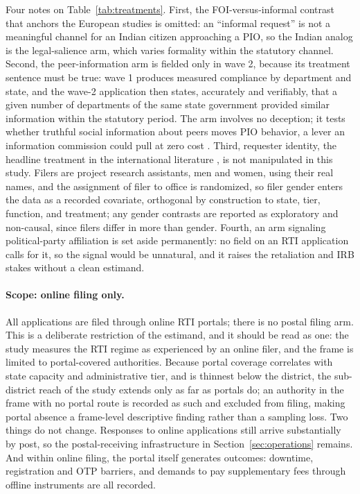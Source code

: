 \documentclass[11pt]{article}
\begin{document}
Four notes on Table~\ref{tab:treatments}. First, the FOI-versus-informal contrast that anchors the European studies \citep{worthy2017, grimmelikhuijsen2019} is omitted: an ``informal request'' is not a meaningful channel for an Indian citizen approaching a PIO, so the Indian analog is the legal-salience arm, which varies formality within the statutory channel. Second, the peer-information arm is fielded only in wave 2, because its treatment sentence must be true: wave 1 produces measured compliance by department and state, and the wave-2 application then states, accurately and verifiably, that a given number of departments of the same state government provided similar information within the statutory period. The arm involves no deception; it tests whether truthful social information about peers moves PIO behavior, a lever an information commission could pull at zero cost \citep{benaaron2017}. Third, requester identity, the headline treatment in the international literature \citep{osji2006, michener2020, pineiro2018}, is not manipulated in this study. Filers are project research assistants, men and women, using their real names, and the assignment of filer to office is randomized, so filer gender enters the data as a recorded covariate, orthogonal by construction to state, tier, function, and treatment; any gender contrasts are reported as exploratory and non-causal, since filers differ in more than gender. Fourth, an arm signaling political-party affiliation is set aside permanently: no field on an RTI application calls for it, so the signal would be unnatural, and it raises the retaliation and IRB stakes without a clean estimand.

\paragraph{Scope: online filing only.} All applications are filed through online RTI portals; there is no postal filing arm. This is a deliberate restriction of the estimand, and it should be read as one: the study measures the RTI regime as experienced by an online filer, and the frame is limited to portal-covered authorities. Because portal coverage correlates with state capacity and administrative tier, and is thinnest below the district, the sub-district reach of the study extends only as far as portals do; an authority in the frame with no portal route is recorded as such and excluded from filing, making portal absence a frame-level descriptive finding rather than a sampling loss. Two things do not change. Responses to online applications still arrive substantially by post, so the postal-receiving infrastructure in Section~\ref{sec:operations} remains. And within online filing, the portal itself generates outcomes: downtime, registration and OTP barriers, and demands to pay supplementary fees through offline instruments are all recorded.
\end{document}
